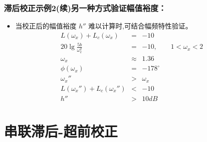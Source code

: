 \documentclass[table]{beamer}
\begin{document}
\begin{frame}
\frametitle{滞后校正示例2(续)另一种方式验证幅值裕度：}
\label{sec-3-2-6}

\begin{itemize}
\item 当校正后的幅值裕度  $h''$ 难以计算时,可结合幅频特性验证。
      \begin{eqnarray*}
      L(\omega_x)+L_c(\omega_x) &=& -10 \\
      20\lg\frac{5b}{\omega_x^2} &=& -10, \qquad 1<\omega_x<2 \\
      \omega_x &\approx& 1.36 \\
      \phi(\omega_x) & = & -178^{\circ} \\
      \omega_x'' &>& \omega_x \\
      L(\omega_x'')+L_c(\omega_x'') &<& -10 \\
      h'' &>& 10dB
      \end{eqnarray*}
\end{itemize}
\end{frame}
\section{串联滞后-超前校正}
\label{sec-4}
\end{document}
